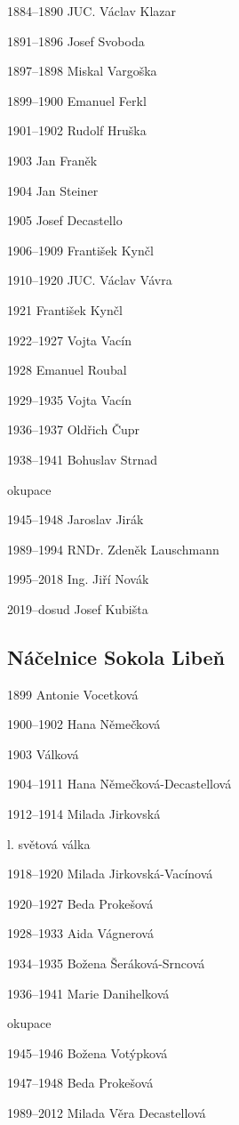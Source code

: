 \documentclass[a5paper, 12pt, twoside]{article}
\begin{document}
1884--1890 JUC. Václav Klazar

1891--1896 Josef Svoboda

1897--1898 Miskal Vargoška

1899--1900 Emanuel Ferkl

1901--1902 Rudolf Hruška

1903 Jan Franěk

1904 Jan Steiner

1905 Josef Decastello

1906--1909 František Kynčl

1910--1920 JUC. Václav Vávra

1921 František Kynčl

1922--1927 Vojta Vacín

1928 Emanuel Roubal

1929--1935 Vojta Vacín

1936--1937 Oldřich Čupr

1938--1941 Bohuslav Strnad

okupace

1945--1948 Jaroslav Jirák

1989--1994 RNDr. Zdeněk Lauschmann

1995--2018 Ing. Jiří Novák

2019--dosud Josef Kubišta

\subsection{Náčelnice Sokola
Libeň}

1899 Antonie Vocetková

1900--1902 Hana Němečková

1903 Válková

1904--1911 Hana Němečková-Decastellová

1912--1914 Milada Jirkovská

l. světová válka

1918--1920 Milada Jirkovská-Vacínová

1920--1927 Beda Prokešová

1928--1933 Aida Vágnerová

1934--1935 Božena Šeráková-Srncová

1936--1941 Marie Danihelková

okupace

1945--1946 Božena Votýpková

1947--1948 Beda Prokešová

1989--2012 Milada Věra Decastellová
\end{document}

